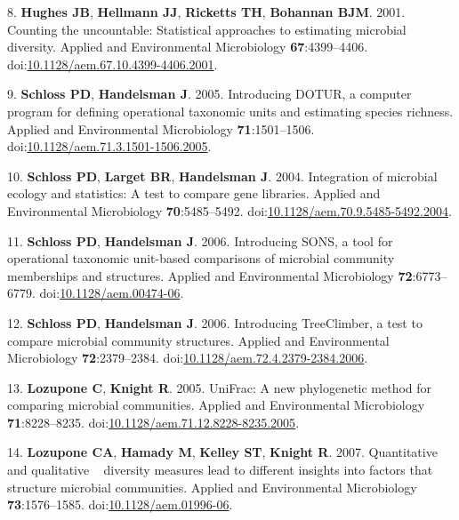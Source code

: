 \documentclass[11pt,]{article}
\begin{document}
\leavevmode\hypertarget{ref-Hughes2001}{}%
8. \textbf{Hughes JB}, \textbf{Hellmann JJ}, \textbf{Ricketts TH},
\textbf{Bohannan BJM}. 2001. Counting the uncountable: Statistical
approaches to estimating microbial diversity. Applied and Environmental
Microbiology \textbf{67}:4399--4406.
doi:\href{https://doi.org/10.1128/aem.67.10.4399-4406.2001}{10.1128/aem.67.10.4399-4406.2001}.

\leavevmode\hypertarget{ref-Schloss2005}{}%
9. \textbf{Schloss PD}, \textbf{Handelsman J}. 2005. Introducing DOTUR,
a computer program for defining operational taxonomic units and
estimating species richness. Applied and Environmental Microbiology
\textbf{71}:1501--1506.
doi:\href{https://doi.org/10.1128/aem.71.3.1501-1506.2005}{10.1128/aem.71.3.1501-1506.2005}.

\leavevmode\hypertarget{ref-Schloss2004a}{}%
10. \textbf{Schloss PD}, \textbf{Larget BR}, \textbf{Handelsman J}.
2004. Integration of microbial ecology and statistics: A test to compare
gene libraries. Applied and Environmental Microbiology
\textbf{70}:5485--5492.
doi:\href{https://doi.org/10.1128/aem.70.9.5485-5492.2004}{10.1128/aem.70.9.5485-5492.2004}.

\leavevmode\hypertarget{ref-Schloss2006b}{}%
11. \textbf{Schloss PD}, \textbf{Handelsman J}. 2006. Introducing SONS,
a tool for operational taxonomic unit-based comparisons of microbial
community memberships and structures. Applied and Environmental
Microbiology \textbf{72}:6773--6779.
doi:\href{https://doi.org/10.1128/aem.00474-06}{10.1128/aem.00474-06}.

\leavevmode\hypertarget{ref-Schloss2006a}{}%
12. \textbf{Schloss PD}, \textbf{Handelsman J}. 2006. Introducing
TreeClimber, a test to compare microbial community structures. Applied
and Environmental Microbiology \textbf{72}:2379--2384.
doi:\href{https://doi.org/10.1128/aem.72.4.2379-2384.2006}{10.1128/aem.72.4.2379-2384.2006}.

\leavevmode\hypertarget{ref-Lozupone2005}{}%
13. \textbf{Lozupone C}, \textbf{Knight R}. 2005. UniFrac: A new
phylogenetic method for comparing microbial communities. Applied and
Environmental Microbiology \textbf{71}:8228--8235.
doi:\href{https://doi.org/10.1128/aem.71.12.8228-8235.2005}{10.1128/aem.71.12.8228-8235.2005}.

\leavevmode\hypertarget{ref-Lozupone2007}{}%
14. \textbf{Lozupone CA}, \textbf{Hamady M}, \textbf{Kelley ST},
\textbf{Knight R}. 2007. Quantitative and qualitative ~ diversity
measures lead to different insights into factors that structure
microbial communities. Applied and Environmental Microbiology
\textbf{73}:1576--1585.
doi:\href{https://doi.org/10.1128/aem.01996-06}{10.1128/aem.01996-06}.
\end{document}
